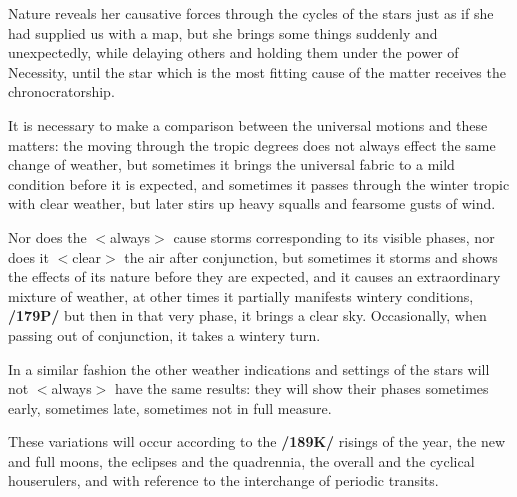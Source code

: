 Nature reveals her causative forces through the cycles of the stars just as if she had supplied us with a map, but she brings some things suddenly and unexpectedly, while delaying others and holding them under the power of Necessity, until the
star which is the most fitting cause of the matter receives the chronocratorship.

It is necessary to make a comparison between the universal motions and these matters: the \Sun\xspace moving through the tropic degrees does not always effect the same change of weather, but sometimes it brings the universal fabric to a mild condition before it is expected, and sometimes it passes through the winter tropic with clear weather, but later stirs up heavy squalls and fearsome gusts of wind. 

Nor does the \Moon $<$always$>$ cause storms corresponding to its visible phases, nor does it $<$clear$>$ the air after conjunction, but sometimes it storms and shows the effects of its nature before they are expected, and it causes an
extraordinary mixture of weather, at other times it partially manifests wintery conditions, \textbf{/179P/} but then
in that very phase, it brings a clear sky. Occasionally, when passing out of conjunction, it takes a wintery turn. 

In a similar fashion the other weather indications and settings of the stars will not $<$always$>$ have the same results: they will show their phases sometimes early, sometimes late, sometimes not in full measure.

These variations will occur according to the \textbf{/189K/} risings of the year, the new and full moons, the eclipses and the quadrennia, the overall and the cyclical houserulers, and with reference to the interchange of periodic transits.

\newpage